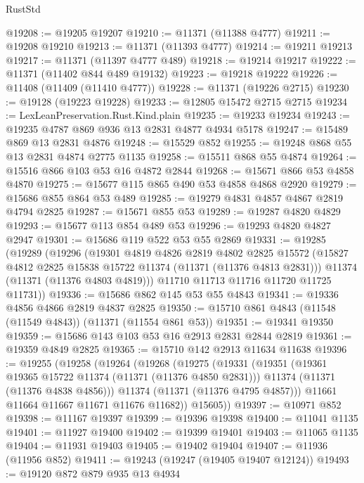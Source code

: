 \begin{lexlean}{RustStd}
\begin{coremodule}
{\begin{coremodule}
{{{{{{{{{{{{{{{{{{{{{{{{{{{{{{{{{@19208 := @19205 @19207
@19210 := @11371 (@11388 @4777)
@19211 := @19208 @19210
@19213 := @11371 (@11393 @4777)
@19214 := @19211 @19213
@19217 := @11371 (@11397 @4777 @489)
@19218 := @19214 @19217
@19222 := @11371 (@11402 @844 @489 @19132)
@19223 := @19218 @19222
@19226 := @11408 (@11409 (@11410 @4777))
@19228 := @11371 (@19226 @2715)
@19230 := @19128 (@19223 @19228)
@19233 := @12805 @15472 @2715 @2715
@19234 := LexLeanPreservation.Rust.Kind.plain
@19235 := @19233 @19234
@19243 := @19235 @4787 @869 @936 @13 @2831 @4877 @4934 @5178
@19247 := @15489 @869 @13 @2831 @4876
@19248 := @15529 @852
@19255 := @19248 @868 @55 @13 @2831 @4874 @2775 @1135
@19258 := @15511 @868 @55 @4874
@19264 := @15516 @866 @103 @53 @16 @4872 @2844
@19268 := @15671 @866 @53 @4858 @4870
@19275 := @15677 @115 @865 @490 @53 @4858 @4868 @2920
@19279 := @15686 @855 @864 @53 @489
@19285 := @19279 @4831 @4857 @4867 @2819 @4794 @2825
@19287 := @15671 @855 @53
@19289 := @19287 @4820 @4829
@19293 := @15677 @113 @854 @489 @53
@19296 := @19293 @4820 @4827 @2947
@19301 := @15686 @119 @522 @53 @55 @2869
@19331 := @19285
    (@19289
      (@19296
        (@19301
          @4819
          @4826
          @2819
          @4802
          @2825
          @15572
          (@15827 @4812 @2825 @15838 @15722 @11374 (@11371 (@11376 @4813 @2831)))
          @11374
          (@11371 (@11376 @4803 @4819)))
        @11710
        @11713
        @11716
        @11720
        @11725
        @11731))
@19336 := @15686 @862 @145 @53 @55 @4843
@19341 := @19336 @4856 @4866 @2819 @4837 @2825
@19350 := @15710 @861 @4843 (@11548 (@11549 @4843)) (@11371 (@11554 @861 @53))
@19351 := @19341 @19350
@19359 := @15686 @143 @103 @53 @16 @2913 @2831 @2844 @2819
@19361 := @19359 @4849 @2825
@19365 := @15710 @142 @2913 @11634 @11638
@19396 := @19255
    (@19258
      (@19264
        (@19268
          (@19275
            (@19331
              (@19351
                (@19361 @19365 @15722 @11374 (@11371 (@11376 @4850 @2831)))
                @11374
                (@11371 (@11376 @4838 @4856)))
              @11374
              (@11371 (@11376 @4795 @4857)))
            @11661
            @11664
            @11667
            @11671
            @11676
            @11682))
        @15605))
@19397 := @10971 @852
@19398 := @11167 @19397
@19399 := @19396 @19398
@19400 := @11041 @1135
@19401 := @11927 @19400
@19402 := @19399 @19401
@19403 := @11065 @1135
@19404 := @11931 @19403
@19405 := @19402 @19404
@19407 := @11936 (@11956 @852)
@19411 := @19243 (@19247 (@19405 @19407 @12124))
@19493 := @19120
    @872
    @879
    @935
    @13
    @4934
}}}}}}}}}}}}}}}}}}}}}}}}}}}}}}}}}
\end{coremodule}}
\end{coremodule}
\end{lexlean}
